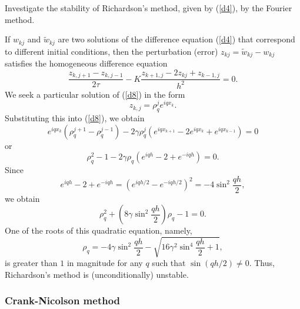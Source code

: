 \begin{problem}
Investigate the
stability of Richardson's method, given by (\ref{d4}), by the
Fourier method.
\end{problem}
\begin{solution}
If $w_{kj}$ and $\tilde{w}_{kj}$ are two
solutions of the difference equation (\ref{d4}) that correspond to
different initial conditions, then the perturbation (error)
$z_{kj}=\tilde{w}_{kj}-w_{kj}$ satisfies the homogeneous difference
equation
\begin{equation}
\frac{z_{k,j+1}-z_{k,j-1}}{2\tau}-K \frac{z_{k+1,
j}-2z_{kj}+z_{k-1,j}}{h^{2}}=0. \label{d8}
\end{equation}
We seek a particular solution of (\ref{d8}) in the form
\[
z_{k,j}=\rho_{q}^{j}e^{iqx_{k}}.
\]
Substituting this into (\ref{d8}), we obtain
\[
e^{iqx_{k}}\left(\rho_{q}^{j+1}-\rho_{q}^{j-1}\right)-
2\gamma\rho_{q}^{j}
\left(e^{iqx_{k+1}}-2e^{iqx_{k}}+e^{iqx_{k-1}}\right)=0
\]
or
\[
\rho^{2}_{q}-1- 2\gamma\rho_{q} \left(e^{iqh}-2+e^{-iqh}\right)=0 .
\]
Since
\[
e^{iqh}-2+e^{-iqh}=\left(e^{iqh/2}-e^{-iqh/2}\right)^{2}=-4\sin^{2}
\frac{qh}{2},
\]
we obtain
\[
\rho^{2}_{q}+\left(8\gamma\sin^{2} \frac{qh}{2}\right)\rho_{q}-1=0.
\]
One of the roots of this quadratic equation, namely,
\[
\rho_{q}=-4\gamma\sin^{2} \frac{qh}{2}- \sqrt{16\gamma^2\sin^{4}
\frac{qh}{2}+1},
\]
is greater than $1$ in magnitude for any $q$ such that $\sin(qh/2)\neq 0$. Thus, Richardson's
method is (unconditionally) unstable.
\end{solution}


\subsubsection{Crank-Nicolson method} 

